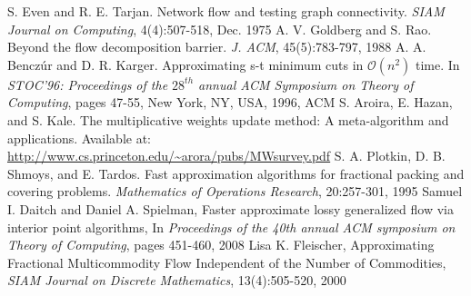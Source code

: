 \documentclass{article}
\begin{document}
\begin{thebibliography}{99}
 S. Even and R. E. Tarjan. Network flow and testing graph connectivity. {\em SIAM Journal on Computing}, 4(4):507-518, Dec. 1975
 A. V. Goldberg and S. Rao. Beyond the flow decomposition barrier. {\em J. ACM}, 45(5):783-797, 1988
 A. A. Bencz\'{u}r and D. R. Karger. Approximating s-t minimum cuts in $\mathcal{O}\left( n^{2}\right)$ time. In {\em STOC'96: Proceedings of the $28^{th}$ annual ACM Symposium on Theory of Computing}, pages 47-55, New York, NY, USA, 1996, ACM
 S. Aroira, E. Hazan, and S. Kale. The multiplicative weights update method: A meta-algorithm and applications. Available at: \url{http://www.cs.princeton.edu/~arora/pubs/MWsurvey.pdf}
 S. A. Plotkin, D. B. Shmoys, and E. Tardos. Fast approximation algorithms for fractional packing and covering problems. {\em Mathematics of Operations Research}, 20:257-301, 1995
Samuel I. Daitch and Daniel A. Spielman, Faster approximate lossy generalized flow via interior point algorithms, In {\em Proceedings of the 40th annual ACM symposium on Theory of Computing}, pages 451-460, 2008 
Lisa K. Fleischer, Approximating Fractional Multicommodity Flow Independent of the Number of Commodities, {\em SIAM Journal on Discrete Mathematics}, 13(4):505-520, 2000
\end{thebibliography}
\end{document}
